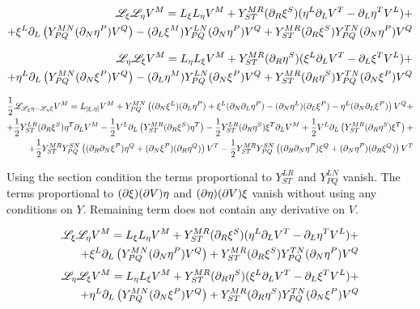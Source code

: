 \documentclass{article}
\begin{document}
\begin{align*}
    \mathscr{L}_\xi\mathscr{L}_\eta V^M = L_\xi L_\eta V^M+Y^{MR}_{ST}(\partial_R\xi^S)(\eta^L\partial_L V^T-\partial_L\eta^T V^L)+\\
    +\xi^L\partial_L\left(Y^{MN}_{PQ}(\partial_N\eta^P)V^Q\right)-(\partial_L\xi^M)Y^{LN}_{PQ}(\partial_N\eta^P)V^Q+Y^{MR}_{ST}(\partial_R\xi^S)Y^{TN}_{PQ}(\partial_N\eta^P)V^Q
\end{align*}

\begin{align*}
    \mathscr{L}_\eta\mathscr{L}_\xi V^M = L_\eta L_\xi V^M+Y^{MR}_{ST}(\partial_R\eta^S)(\xi^L\partial_L V^T-\partial_L\xi^T V^L)+\\
    +\eta^L\partial_L\left(Y^{MN}_{PQ}(\partial_N\xi^P)V^Q\right)-(\partial_L\eta^M)Y^{LN}_{PQ}(\partial_N\xi^P)V^Q+Y^{MR}_{ST}(\partial_R\eta^S)Y^{TN}_{PQ}(\partial_N\xi^P)V^Q
\end{align*}

\begin{align*}
\frac{1}{2}\mathscr{L}_{\mathscr{L_\xi}\eta-\mathscr{L_\eta}\xi}V^M = L_{[\xi,\eta]}V^M+Y^{MN}_{PQ}\left((\partial_N\xi^L)(\partial_L\eta^P)+\xi^L(\partial_N\partial_L\eta^P)-(\partial_N\eta^L)(\partial_L\xi^P)-\eta^L(\partial_N\partial_L\xi^P)\right)V^Q+\\
+\frac{1}{2}Y^{LR}_{ST}(\partial_R\xi^S)\eta^T\partial_LV^M-\frac{1}{2}V^L\partial_L\left(Y^{MR}_{ST}(\partial_R\xi^S)\eta^T\right)-\frac{1}{2}Y^{LR}_{ST}(\partial_R\eta^S)\xi^T\partial_LV^M+\frac{1}{2}V^L\partial_L\left(Y^{MR}_{ST}(\partial_R\eta^S)\xi^T\right)+\\
+\frac{1}{2}Y^{MR}_{ST}Y^{SN}_{PQ}\left((\partial_R\partial_N\xi^P)\eta^Q+(\partial_N\xi^P)(\partial_R\eta^Q)\right)V^T-\frac{1}{2}Y^{MR}_{ST}Y^{SN}_{PQ}\left((\partial_R\partial_N\eta^P)\xi^Q+(\partial_N\eta^P)(\partial_R\xi^Q)\right)V^T
\end{align*}

Using the section condition the terms proportional to $Y^{LR}_{ST}$ and $Y^{LN}_{PQ}$ vanish. The terms proportional to $(\partial\xi)(\partial V)\eta$ and $(\partial\eta)(\partial V)\xi$ vanish without using any conditions on $Y$. Remaining term does not contain any derivative on $V$. 

\begin{align*}
    \mathscr{L}_\xi\mathscr{L}_\eta V^M = L_\xi L_\eta V^M+Y^{MR}_{ST}(\partial_R\xi^S)(\eta^L\partial_L V^T-\partial_L\eta^T V^L)+\\
    +\xi^L\partial_L\left(Y^{MN}_{PQ}(\partial_N\eta^P)V^Q\right)+Y^{MR}_{ST}(\partial_R\xi^S)Y^{TN}_{PQ}(\partial_N\eta^P)V^Q
\end{align*}
\begin{align*}
    \mathscr{L}_\eta\mathscr{L}_\xi V^M = L_\eta L_\xi V^M+Y^{MR}_{ST}(\partial_R\eta^S)(\xi^L\partial_L V^T-\partial_L\xi^T V^L)+\\
    +\eta^L\partial_L\left(Y^{MN}_{PQ}(\partial_N\xi^P)V^Q\right)+Y^{MR}_{ST}(\partial_R\eta^S)Y^{TN}_{PQ}(\partial_N\xi^P)V^Q
\end{align*}
\end{document}
